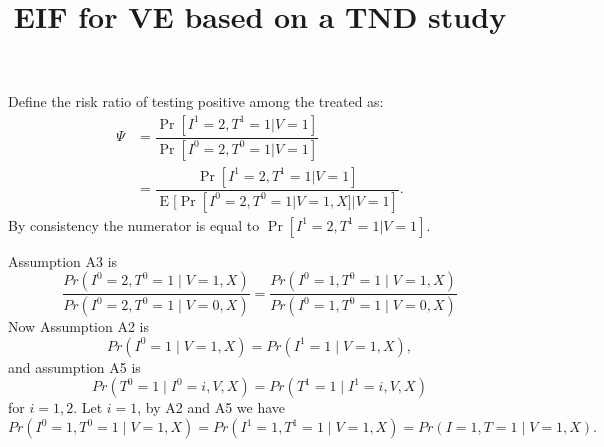 \documentclass{article}
\title{EIF for VE based on a TND study}
\DeclareMathOperator{\E}{E}
\begin{document}
\maketitle


Define the risk ratio of testing positive among the treated as:
\begin{align*}
    \Psi &= \dfrac{\Pr[I^1 = 2, T^1 = 1 | V = 1]}{\Pr[I^0 = 2, T^0 = 1 | V = 1]} \\
         &= \dfrac{\Pr[I^1 = 2, T^1 = 1 | V = 1]}{\E[\Pr[I^0 = 2, T^0 = 1 | V = 1, X] | V = 1]}.
\end{align*}
By consistency the numerator is equal to $\Pr[I^1 = 2, T^1 = 1 | V = 1]$.

Assumption A3 is
$$\dfrac{Pr(I^0=2, T^0=1\mid V=1, X)}{Pr(I^0=2, T^0=1\mid V=0, X)} = \dfrac{Pr(I^0=1, T^0=1\mid V=1, X)}{Pr(I^0=1, T^0=1\mid V=0, X)}$$
Now Assumption A2 is $$Pr(I^0=1\mid V=1, X)=Pr(I^1=1\mid V=1, X),$$ and assumption
A5 is
$$Pr(T^0=1\mid I^0=i, V, X)=Pr(T^1=1\mid I^1=i, V, X)$$
for $i=1, 2$.
Let $i=1$, by A2 and A5 we have
$$Pr(I^0=1, T^0=1\mid V=1, X)=Pr(I^1=1, T^1=1\mid V=1, X)=Pr(I=1, T=1\mid V=1, X).$$
\end{document}
